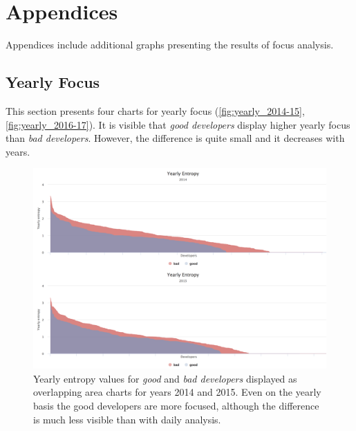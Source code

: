 \chapter{Appendices}

Appendices include additional graphs presenting the results of focus analysis.

\section{Yearly Focus}

This section presents four charts for yearly focus (\autoref{fig:yearly_2014-15}, \autoref{fig:yearly_2016-17}). It is visible that \textit{good developers} display higher yearly focus than \textit{bad developers}. However, the difference is quite small and it decreases with years.

\begin{figure}[htpb]
  \centering
  \includegraphics[width=1\textwidth]{figures/yearly_2014-15}
  \caption[Yearly Focus Chart for 2014 and 2015]{Yearly entropy values for \textit{good} and \textit{bad developers} displayed as overlapping area charts for years 2014 and 2015. Even on the yearly basis the good developers are more focused, although the difference is much less visible than with daily analysis. } \label{fig:yearly_2014-15}
\end{figure}

